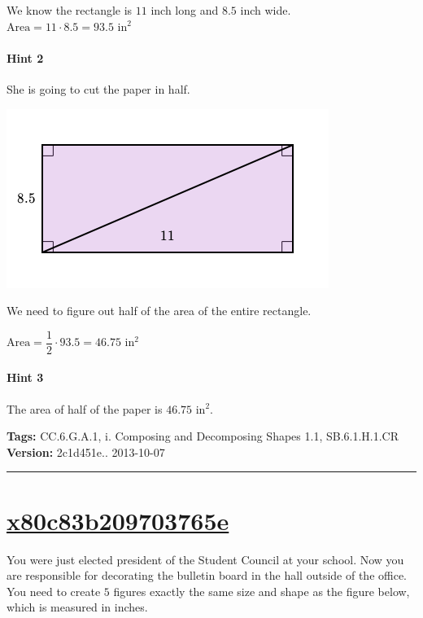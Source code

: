 \documentclass[twocolumn,10pt]{article}
\def\shrinkfactor{0.55}
\begin{document}
We know the rectangle is $11$ inch long and $8.5$ inch wide.  
${\text{Area}}=11\cdot8.5=93.5\text{ in}^2$  

\paragraph{Hint 2}She is going to cut the paper in half.  


\includegraphics[scale=\shrinkfactor]{figures/7c2af295e1180eb4e39fbbd8921bcd930561a85b.png}  

We need to figure out half of the area of the entire rectangle.    

${\text{Area}}=\dfrac{1}{2}\cdot93.5=46.75\text{ in}^2$  

\paragraph{Hint 3}The area of half of the paper is $46.75\text{ in}^2$.



\medskip
\noindent
\textbf{Tags:} {\footnotesize CC.6.G.A.1, i.	Composing and Decomposing Shapes 1.1, SB.6.1.H.1.CR}\\
\textbf{Version:} 2c1d451e.. 2013-10-07
\smallskip\hrule





\section{\href{https://www.khanacademy.org/devadmin/content/items/x80c83b209703765e}{x80c83b209703765e}}

\noindent
You were just elected president of the Student Council at your school.  Now you are responsible for decorating the bulletin board in the hall outside of the office.  You need to create $5$ figures exactly the same size and shape as the figure below, which is measured in inches.  
\end{document}
